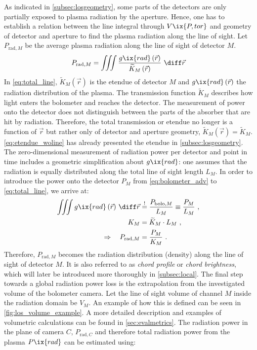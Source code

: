 %
            As indicated in \cref{subsec:losgeometry}, some parts of the detectors are only partially exposed to plasma radiation by the aperture. Hence, one has to establish a relation between the line integral through $V\ix{P, tor}$ and geometry of detector and aperture to find the plasma radiation along the line of sight. Let $P_{\text{rad}, M}$ be the average plasma radiation along the line of sight of detector $M$.%
%
            \begin{align}%
                P_{\text{rad}, M}=\iiint \frac{g\ix{rad}\left(\vec{r}\right)}{\widetilde{K}_{M}\left(\vec{r}\right)}\,\,\diff\vec{r}\label{eq:total_line}
            \end{align}%
%
            In \cref{eq:total_line}, $\widetilde{K}_{M}\left(\vec{r}\right)$ is the etendue of detector $M$ and $g\ix{rad}\left(\vec{r}\right)$ the radiation distribution of the plasma. The transmission function $\widetilde{K}_{M}$ describes how light enters the bolometer and reaches the detector. The measurement of power onto the detector does not distinguish between the parts of the absorber that are hit by radiation. Therefore, the total transmission or etendue no longer is a function of $\vec{r}$ but rather only of detector and aperture geometry, $\widetilde{K}_{M}\left(\vec{r}\right)=\widetilde{K}_{M}$. \autoref{eq:etendue_woline} has already presented the etendue in \cref{subsec:losgeometry}.\\%
            The zero-dimensional measurement of radiation power per detector and point in time includes a geometric simplification about $g\ix{rad}$: one assumes that the radiation is equally distributed along the total line of sight length $L_{M}$. In order to introduce the power onto the detector $P_{M}$ from \cref{eq:bolometer_adv} to \cref{eq:total_line}, we arrive at:%
%
            \begin{align}%
                \iiint g\ix{rad}\left(\vec{r}\right)\,\diff\vec{r}&\overset{!}{=}\frac{P_{\text{bolo}, M}}{L_{M}}\equiv\frac{P_{M}}{L_{M}}\,\,,\nonumber\\%
                K_{M}&=\widetilde{K}_{M}\cdot L_{M}\,\,,\nonumber\\%
                \Rightarrow\quad P_{\text{rad}, M}&=\frac{P_{M}}{K_{M}}\,\,.\label{eq:etendue_power}%
            \end{align}%
%
            Therefore, $P_{\text{rad}, M}$ becomes the radiation distribution (density) along the line of sight of detector $M$. It is also referred to as \textit{chord profile} or \textit{chord brightness}, which will later be introduced more thoroughly in \cref{subsec:local}. The final step towards a global radiation power loss is the extrapolation from the investigated volume of the bolometer camera. Let the line of sight volume of channel $M$ inside the radiation domain be $V_{M}$. An example of how this is defined can be seen in \cref{fig:los_volume_example}. A more detailed description and examples of volumetric calculations can be found in \cref{sec:evalmetrics}. The radiation power in the plane of camera $C$, $P_{\text{rad}, C}$ and therefore total radiation power from the plasma $P\ix{rad}$ can be estimated using:%
